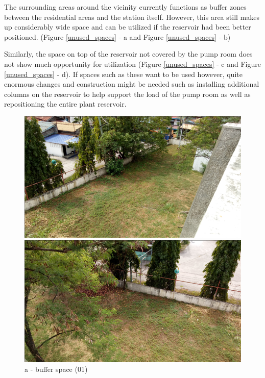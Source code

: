 The surrounding areas around the vicinity currently functions as buffer zones between the residential areas and the station itself. However, this area still makes up considerably wide space and can be utilized if the reservoir had been better positioned. (Figure \ref{unused_spaces} - a and Figure  \ref{unused_spaces} - b)

Similarly, the space on top of the reservoir not covered by the pump room does not show much opportunity for utilization (Figure \ref {unused_spaces} - c and Figure \ref{unused_spaces} - d). If spaces such as these want to be used however, quite enormous changes and construction might be needed such as installing additional columns on the reservoir to help support the load of the pump room as well as repositioning the entire plant reservoir.

\begin{figure} [!htb]
	\begin{minipage}[b]{0.22\linewidth}
		\centering
		\includegraphics[width=\textwidth]{figures/fig_ch043_unused_space3}
		\caption*{a - buffer space (01) \\}
		\label{ch043_unused_space3}
	\end{minipage}
	\hspace{0.05cm}
	\begin{minipage}[b]{0.22\linewidth}
		\centering
		\includegraphics[width=\textwidth]{figures/fig_ch043_unused_space4}

\end{minipage}
\end{figure}
